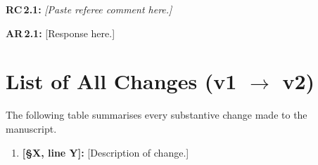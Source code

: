 \documentclass[12pt,a4paper]{article}
\newcommand{\RC}[2]{\noindent\begin{reviewerbox}\textbf{\textcolor{reviewergray}{RC\,#1.#2:}}}
\newcommand{\RCend}{\end{reviewerbox}}
\newcommand{\AR}[2]{\noindent\begin{authorbox}\textbf{\textcolor{authorblue}{AR\,#1.#2:}}}
\newcommand{\ARend}{\end{authorbox}}
\begin{document}
\RC{2}{1}
  \textit{[Paste referee comment here.]}
\RCend

\AR{2}{1}
  [Response here.]
\ARend

\section*{List of All Changes (v1 $\to$ v2)}

\noindent The following table summarises every substantive change made to the manuscript.

\medskip
\begin{enumerate}[leftmargin=1.5em]
  \item \textbf{[§X, line Y]:} [Description of change.]
\end{enumerate}
\end{document}
